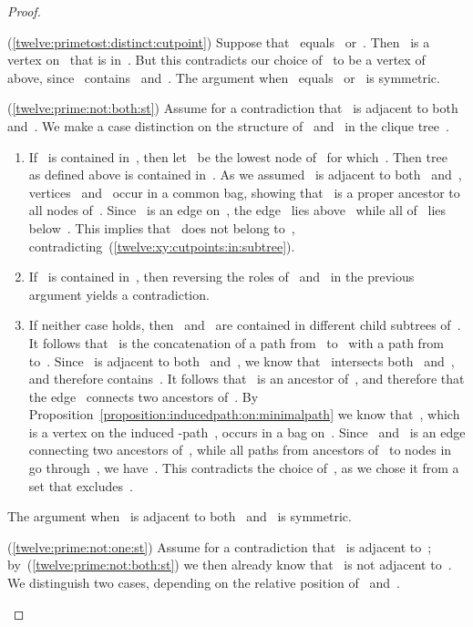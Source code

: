 \begin{proof}
\begin{claimproof}
(\ref{twelve:primetost:distinct:cutpoint}) Suppose that~ equals~ or~. Then~ is a vertex on~ that is in~. But this contradicts our choice of~ to be a vertex of~ above, since~ contains~ and~. The argument when~ equals~ or~ is symmetric.

(\ref{twelve:prime:not:both:st}) Assume for a contradiction that~ is adjacent to both~ and~. We make a case distinction on the structure of~ and~ in the clique tree~.

\begin{enumerate}
	\item If~ is contained in~, then let~ be the lowest node of~ for which~. Then tree~ as defined above is contained in~. As we assumed~ is adjacent to both~ and~, vertices~ and~ occur in a common bag, showing that~ is a proper ancestor to all nodes of~. Since~ is an edge on~, the edge~ lies above~ while all of~ lies below~. This implies that~ does not belong to~, contradicting~(\ref{twelve:xy:cutpoints:in:subtree}).
	
	\item If~ is contained in~, then reversing the roles of~ and~ in the previous argument yields a contradiction.
	
	\item If neither case holds, then~ and~ are contained in different child subtrees of~. It follows that~ is the concatenation of a path from~ to~ with a path from~ to~. Since~ is adjacent to both~ and~, we know that~ intersects both~ and~, and therefore contains~. It follows that~ is an ancestor of~, and therefore that the edge~ connects two ancestors of~. By Proposition~\ref{proposition:inducedpath:on:minimalpath} we know that~, which is a vertex on the induced -path~, occurs in a bag on~. Since~ and~ is an edge connecting two ancestors of~, while all paths from ancestors of~ to nodes in~ go through~, we have~. This contradicts the choice of~, as we chose it from a set that excludes~.
\end{enumerate}

The argument when~ is adjacent to both~ and~ is symmetric.

(\ref{twelve:prime:not:one:st}) Assume for a contradiction that~ is adjacent to~; by~(\ref{twelve:prime:not:both:st}) we then already know that~ is not adjacent to~. We distinguish two cases, depending on the relative position of~ and~.


\end{claimproof}
\end{proof}
